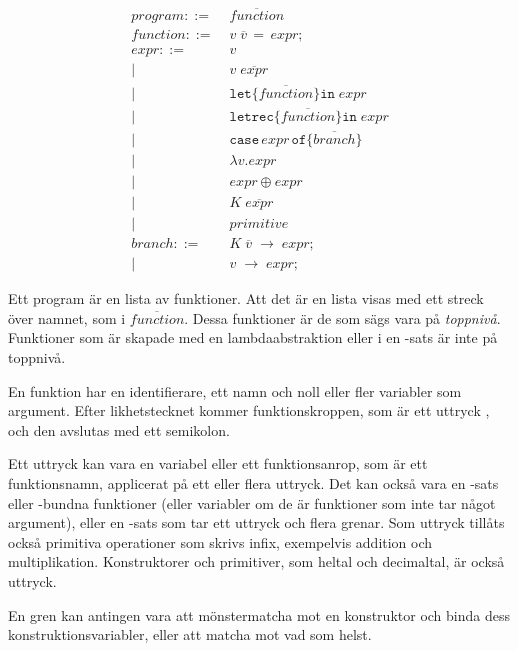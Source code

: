 \documentclass[Rapport]{subfiles}
\begin{document}
\begin{equation*}
\begin{aligned}
program ::=&\; \overline{function} \\ 
function ::=&\; v \; \overline{v} \, \mathtt{=} \, expr \mathtt{;} \\
expr ::=&\;  v \\
       |&\; v \; \overline{expr}  \\ 
       |&\; \mathtt{let \{} \overline{function} \mathtt{\} in }\; expr \\
       |&\; \mathtt{letrec \{} \overline{function} \mathtt{\} in} \; expr \\
       |&\; \mathtt{case}\,expr\,\mathtt{of \{} \overline{branch} \mathtt{\}} \\
       |&\; \mathtt{\lambda } v \mathtt{.} expr \\
       |&\; expr \oplus expr \\ 
       |&\; K \; \overline{expr} \\
       |&\; primitive \\
branch ::=&\; K \; \overline{v} \; \mathtt{\rightarrow} \; expr \mathtt{;} \\
         |&\; v \; \mathtt{\rightarrow} \; expr \mathtt{;}
\end{aligned}
\end{equation*}


Ett program är en lista av funktioner. Att det är en lista visas med ett streck över namnet, som i $\overline{function}$.
Dessa funktioner är de som sägs vara på \emph{toppnivå}. Funktioner som är 
skapade med en lambdaabstraktion eller i en -sats är inte på toppnivå. 

En funktion har en identifierare, ett namn och noll eller fler variabler som argument. Efter likhetstecknet
kommer funktionskroppen, som är ett uttryck , och den avslutas med
ett semikolon.

    Ett uttryck kan vara en variabel eller ett funktionsanrop, som är ett
funktionsnamn, applicerat på ett eller flera uttryck. Det kan också vara en -sats eller
-bundna funktioner (eller variabler om de är funktioner som
inte tar något argument), eller en -sats som tar ett uttryck och flera grenar.
Som uttryck tillåts också primitiva operationer som skrivs infix, exempelvis addition 
och multiplikation. Konstruktorer och primitiver, som heltal och decimaltal, är också uttryck.

    En gren kan antingen vara att mönstermatcha mot en konstruktor och binda
dess konstruktionsvariabler, eller att matcha mot vad som helst.
\end{document}
